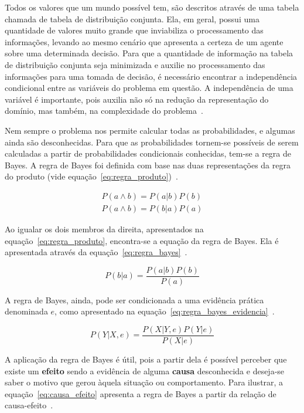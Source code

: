 Todos os valores que um mundo possível tem, são descritos através de uma tabela chamada de tabela de distribuição conjunta. Ela, em geral, possui uma quantidade de valores muito grande que inviabiliza o processamento das informações, levando ao mesmo cenário que apresenta a certeza de um agente sobre uma determinada decisão. Para que a quantidade de informação na tabela de distribuição conjunta seja minimizada e auxilie no processamento das informações para uma tomada de decisão, é necessário encontrar a independência condicional entre as variáveis do problema em questão. A independência de uma variável é importante, pois auxilia não só na redução da representação do domínio, mas também, na complexidade do problema~\cite{russell:2002, faceli:2011}.

Nem sempre o problema nos permite calcular todas as probabilidades, e algumas ainda são desconhecidas. Para que as probabilidades tornem-se possíveis de serem calculadas a partir de probabilidades condicionais conhecidas, tem-se a regra de Bayes. A regra de Bayes foi definida com base nas duas representações da regra do produto (vide equação~\ref{eq:regra_produto})~\cite{russell:2002}.

\begin{subequations}
    \label{eq:regra_produto}
    \begin{align}
        P(a \land b) = P(a|b)P(b)\\
        P(a \land b) = P(b|a)P(a)
    \end{align}
\end{subequations}

Ao igualar os dois membros da direita, apresentados na equação~\ref{eq:regra_produto}, encontra-se a equação da regra de Bayes. Ela é apresentada através da equação~\ref{eq:regra_bayes}~\cite{russell:2002}.

\begin{equation}
    \label{eq:regra_bayes}
    P(b|a) = \frac{P(a|b)P(b)}{P(a)}
\end{equation}

A regra de Bayes, ainda, pode ser condicionada a uma evidência prática denominada $e$, como apresentado na equação~\ref{eq:regra_bayes_evidencia}~\cite{russell:2002}.

\begin{equation}
    \label{eq:regra_bayes_evidencia}
    P(Y|X, e) = \frac{P(X|Y, e)P(Y|e)}{P(X|e)}
\end{equation}

A aplicação da regra de Bayes é útil, pois a partir dela é possível perceber que existe um \textbf{efeito} sendo a evidência de alguma \textbf{causa} desconhecida e deseja-se saber o motivo que gerou àquela situação ou comportamento. Para ilustrar, a equação~\ref{eq:causa_efeito} apresenta a regra de Bayes a partir da relação de causa-efeito~\cite{russell:2002}.

